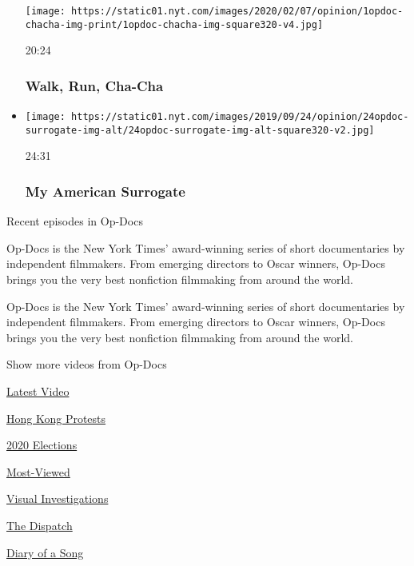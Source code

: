 \begin{itemize}
  \texttt{[image: https://static01.nyt.com/images/2020/02/07/opinion/1opdoc-chacha-img-print/1opdoc-chacha-img-square320-v4.jpg]}

  20:24

  \hypertarget{walk-run-cha-cha}{%
  \subsubsection{Walk, Run, Cha-Cha}\label{walk-run-cha-cha}}
\item
  \href{https://www.nytimes.com/video/opinion/100000006463736/my-american-surrogate.html?action=click\&module=video-series-bar\&region=header\&pgtype=Article\&playlistId=video/op-docs}{}

  \texttt{[image: https://static01.nyt.com/images/2019/09/24/opinion/24opdoc-surrogate-img-alt/24opdoc-surrogate-img-alt-square320-v2.jpg]}

  24:31

  \hypertarget{my-american-surrogate}{%
  \subsubsection{My American Surrogate}\label{my-american-surrogate}}
\end{itemize}

Recent episodes in Op-Docs

Op-Docs is the New York Times' award-winning series of short
documentaries by independent filmmakers. From emerging directors to
Oscar winners, Op-Docs brings you the very best nonfiction filmmaking
from around the world.

Op-Docs is the New York Times' award-winning series of short
documentaries by independent filmmakers. From emerging directors to
Oscar winners, Op-Docs brings you the very best nonfiction filmmaking
from around the world.

Show more videos from Op-Docs

\href{/video}{}

\href{/video/latest-video}{Latest Video}

\href{/video/hk-protest}{Hong Kong Protests}

\href{/video/2020-Elections}{2020 Elections}

\href{/video/Most-Viewed}{Most-Viewed}

\href{/video/investigations}{Visual Investigations}

\href{/video/on-the-ground}{The Dispatch}

\href{/video/diaryofasong}{Diary of a Song}


